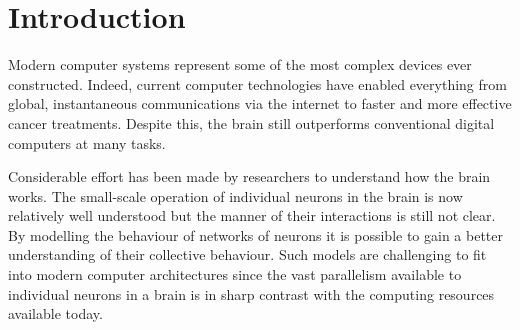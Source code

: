 \chapter{Introduction}
	
	
	Modern computer systems represent some of the most complex devices ever
	constructed. Indeed, current computer technologies have enabled everything
	from global, instantaneous communications via the internet to faster and more
	effective cancer treatments\cite{nassif}. Despite this, the brain still
	outperforms conventional digital computers at many tasks.
	
	Considerable effort has been made by researchers to understand how the brain
	works. The small-scale operation of individual neurons in the brain is now
	relatively well understood but the manner of their interactions is still not
	clear. By modelling the behaviour of networks of neurons it is possible to
	gain a better understanding of their collective behaviour. Such models are
	challenging to fit into modern computer architectures since the vast
	parallelism available to individual neurons in a brain is in sharp contrast
	with the computing resources available today.

